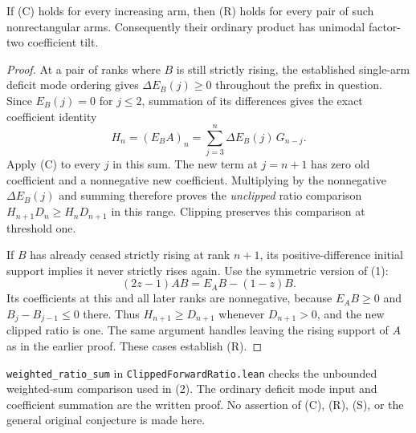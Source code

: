 \begin{proposition}
If (C) holds for every increasing arm, then (R) holds for
every pair of such nonrectangular arms. Consequently their
ordinary product has unimodal factor-two coefficient tilt.
\end{proposition}
\begin{proof}
At a pair of ranks where $B$ is still strictly rising,
the established single-arm deficit mode ordering gives
$\Delta E_B(j)\ge0$ throughout the prefix in question.
Since $E_B(j)=0$ for $j\le2$, summation of its differences
gives the exact coefficient identity
\[
 H_n=(E_B A)_n
       =\sum_{j=3}^{n}\Delta E_B(j)\,G_{n-j}.
                                                        \tag{2}
\]
Apply (C) to every $j$ in this sum. The new term at $j=n+1$
has zero old coefficient and a nonnegative new coefficient.
Multiplying by the nonnegative $\Delta E_B(j)$ and summing
therefore proves the \emph{unclipped} ratio comparison
$H_{n+1}D_n\ge H_nD_{n+1}$ in this range. Clipping preserves
this comparison at threshold one.

If $B$ has already ceased strictly rising at rank $n+1$,
its positive-difference initial support implies it never
strictly rises again. Use the symmetric version of (1):
\[
 (2z-1)AB=E_A B-(1-z)B.
\]
Its coefficients at this and all later ranks are nonnegative,
because $E_A B\ge0$ and $B_j-B_{j-1}\le0$ there.
Thus $H_{n+1}\ge D_{n+1}$ whenever $D_{n+1}>0$, and
the new clipped ratio is one. The same argument handles
leaving the rising support of $A$ as in the earlier proof.
These cases establish (R).
\end{proof}

\texttt{weighted\_ratio\_sum} in
\texttt{ClippedForwardRatio.lean} checks the unbounded
weighted-sum comparison used in (2). The ordinary deficit
mode input and coefficient summation are the written proof.
No assertion of (C), (R), (S), or the general original
conjecture is made here.

